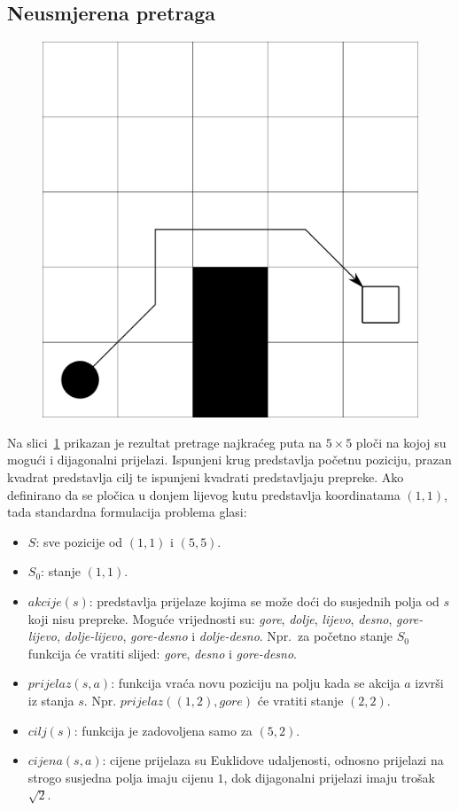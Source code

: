 \documentclass[times, utf8, zavrsni, numeric]{fer}
\begin{document}
\subsection{Neusmjerena pretraga}

\begin{figure}[h] 
	\centering
	\includegraphics[width=0.3\linewidth]{images/basicGrid.pdf}
	\caption{}
	\label{fig:basicGrid}
\end{figure} 

Na slici~\ref{fig:basicGrid} prikazan je rezultat pretrage najkraćeg puta na \(5\times5\) ploči na kojoj su mogući i dijagonalni prijelazi.
Ispunjeni krug predstavlja početnu poziciju, prazan kvadrat predstavlja cilj te ispunjeni kvadrati predstavljaju prepreke.
Ako definirano da se pločica u donjem lijevog kutu predstavlja koordinatama \((1, 1)\), tada standardna formulacija problema glasi:
\begin{itemize}
    \item \(S\): sve pozicije od \((1, 1)\) i \((5, 5)\).
    \item \(S_0\): stanje \((1, 1)\).
    \item \(akcije(s)\): predstavlja prijelaze kojima se može doći do susjednih polja od \(s\) koji nisu prepreke. 
    Moguće vrijednosti su: \textit{gore}, \textit{dolje}, \textit{lijevo}, \textit{desno}, \textit{gore-lijevo}, \textit{dolje-lijevo}, \textit{gore-desno} i \textit{dolje-desno}. 
    Npr.\ za početno stanje \(S_0\) funkcija će vratiti slijed: \textit{gore}, \textit{desno} i \textit{gore-desno}. 
    \item \(prijelaz(s, a)\): funkcija vraća novu poziciju na polju kada se akcija \(a\) izvrši iz stanja \(s\). Npr. \(prijelaz((1, 2), gore)\) će vratiti stanje \((2, 2)\).
    \item \(cilj(s)\): funkcija je zadovoljena samo za \((5, 2)\).
    \item \(cijena(s, a)\): cijene prijelaza su Euklidove udaljenosti, odnosno prijelazi na strogo susjedna polja imaju cijenu \(1\), dok dijagonalni prijelazi imaju trošak \(\sqrt{2}\).
\end{itemize}
\end{document}
